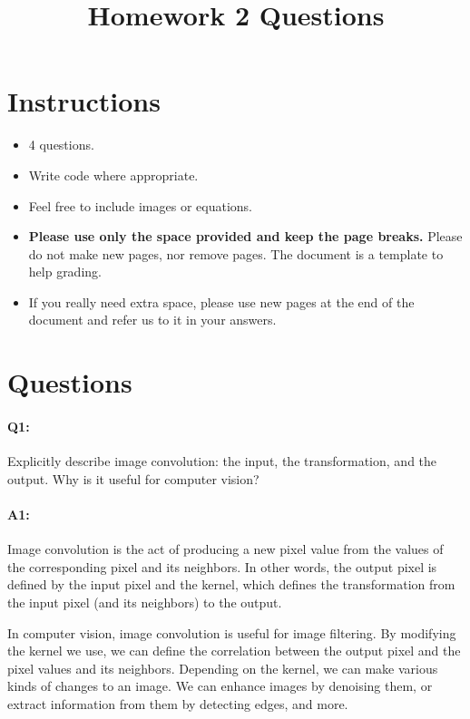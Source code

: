 \title{\vspace{-1cm}Homework 2 Questions}



	\maketitle
	\vspace{-3cm}
	\thispagestyle{fancy}

	\section*{Instructions}
	\begin{itemize}
		\item 4 questions.
		\item Write code where appropriate.
		\item Feel free to include images or equations.
		\item \textbf{Please use only the space provided and keep the page breaks.} Please do not make new pages, nor remove pages. The document is a template to help grading.
		\item If you really need extra space, please use new pages at the end of the document and refer us to it in your answers.
	\end{itemize}

	\section*{Questions}

	\paragraph{Q1:} Explicitly describe image convolution: the input, the transformation, and the output. Why is it useful for computer vision?

	\paragraph{A1:}
    Image convolution is the act of producing a new pixel value from the values of the corresponding pixel and its neighbors. In other words, the output pixel is defined by the input pixel and the kernel, which defines the transformation from the input pixel (and its neighbors) to the output.

    In computer vision, image convolution is useful for image filtering. By modifying the kernel we use, we can define the correlation between the output pixel and the pixel values and its neighbors. Depending on the kernel, we can make various kinds of changes to an image. We can enhance images by denoising them, or extract information from them by detecting edges, and more.


